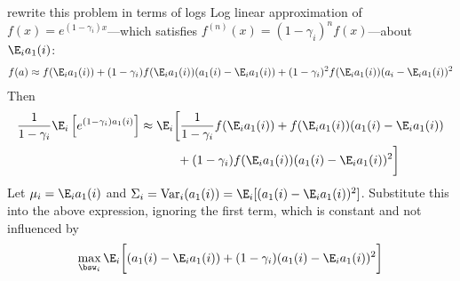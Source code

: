 \documentclass[12pt]{article}
\theoremstyle{plain}
\theoremstyle{definition}
\theoremstyle{remark}
\newcommand{\Var}{\operatorname{Var}}
\begin{document}
rewrite this problem in terms of logs
Log linear approximation of $f(x) = e^{(1-\gamma_i)x}$---which satisfies
$f^{(n)}(x)=(1-\gamma_i)^n f(x)$---about $\E_ia_1(i)$:
\begin{align*}
  f(a) \approx
  f(\E_ia_1(i))
  + (1-\gamma_i)f(\E_ia_1(i)) (a_1(i)-\E_ia_1(i))
  + (1-\gamma_i)^2f(\E_ia_1(i)) (a_i-\E_ia_1(i))^2
\end{align*}
Then
\begin{align*}
  \frac{1}{1-\gamma_i}
  \E_i\left[
    e^{(1-\gamma_i) a_1(i)}
    \right]
  &\approx
  \E_i
  \bigg[
  \frac{1}{1-\gamma_i}
  f(\E_ia_1(i))
  + f(\E_ia_1(i)) (a_1(i)-\E_ia_1(i))
  \\
  &\qquad\quad
  + (1-\gamma_i)f(\E_ia_1(i)) (a_1(i)-\E_ia_1(i))^2
  \bigg]
\end{align*}
Let $\mu_i=\E_ia_1(i)$ and $\Sigma_i = \Var_i(a_1(i))=\E_i[(a_1(i)-\E_ia_1(i))^2]$.
Substitute this into the above expression, ignoring the first term,
which is constant and not influenced by
\begin{align*}
  \max_{\bsw_i}
  \E_i
  \bigg[
  (a_1(i)-\E_ia_1(i))
  + (1-\gamma_i)(a_1(i)-\E_ia_1(i))^2
  \bigg]
\end{align*}
\end{document}
